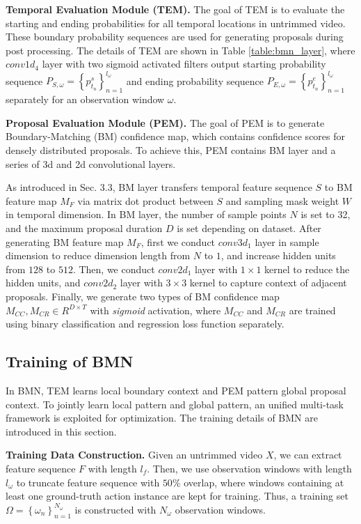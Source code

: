 \documentclass[10pt,twocolumn,letterpaper]{article}
\begin{document}
\noindent
\textbf{Temporal Evaluation Module (TEM).}
The goal of TEM is to evaluate the starting and ending probabilities for all temporal locations in untrimmed video. These boundary probability sequences are used for generating proposals during post processing.
The details of TEM are shown in Table \ref{table:bmn_layer}, where $conv1d_4$ layer with two sigmoid activated filters output starting probability sequence $P_{S,\omega}=\left \{ p^s_{t_n} \right \}_{n=1}^{l_{\omega}}$ and ending probability sequence $P_{E,\omega}=\left \{ p^e_{t_n} \right \}_{n=1}^{l_{\omega}}$ separately for an observation window ${\omega}$.

\noindent
\textbf{Proposal Evaluation Module (PEM).}
The goal of PEM is to generate Boundary-Matching (BM) confidence map, which contains  confidence scores for densely distributed proposals. To achieve this, PEM contains BM layer and a series of 3d and 2d convolutional layers.

As introduced in Sec. 3.3, BM layer transfers temporal feature sequence $S$ to BM feature map $M_F$ via matrix dot product between  $S$ and sampling mask weight $W$ in temporal dimension.
In BM layer, the number of  sample points $N$ is set to 32, and the maximum proposal duration $D$ is set depending on dataset.
After generating BM feature map $M_F$, first we conduct $conv3d_1$ layer in sample dimension to reduce dimension length from $N$ to $1$, and increase hidden units from $128$ to $512$. 
Then, we conduct $conv2d_1$ layer with $1\times1$ kernel to reduce the hidden units, and $conv2d_2$ layer with $3\times3$ kernel to capture context of adjacent proposals. Finally, we generate two types of BM confidence map $M_{CC}, M_{CR} \in R^{D\times T}$ with \emph{sigmoid} activation, where $M_{CC}$ and $M_{CR}$ are trained using binary classification and regression loss function separately.



\subsection{Training of BMN}

In BMN, TEM learns local boundary context and PEM pattern global proposal  context.
To jointly learn local pattern and global pattern, an unified multi-task framework is exploited for optimization. The training details of BMN are introduced in this section.


\noindent
\textbf{Training Data Construction.}
Given an untrimmed video $X$, we can extract feature sequence $F$ with length $l_f$.
Then, we use observation windows with length $l_{\omega}$ to truncate feature sequence with $50\%$ overlap, where windows containing at least one ground-truth action instance are kept for training.
Thus, a training set  $\Omega= \left \{ \omega_n \right \}_{n=1}^{N_{\omega }}$ is constructed with $N_{\omega}$ observation windows.
\end{document}

